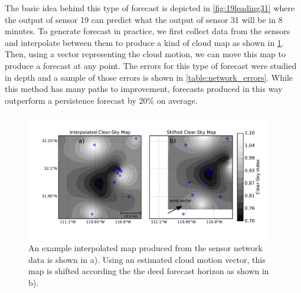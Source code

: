 The basic idea behind this type of forecast is depicted in
\cref{fig:19leading31} where the output of sensor 19 can predict what
the output of sensor 31 will be in 8 minutes.
To generate forecast in practice, we first collect data from the
sensors and interpolate between them to produce a kind of cloud map as
shown in \cref{fig:clearmap}.
Then, using a vector representing the cloud motion, we can move this
map to produce a forecast at any point.
The errors for this type of forecast were studied in depth and a
sample of those errors is shown in \cref{table:network_errors}.
While this method has many paths to improvement, forecasts produced in
this way outperform a persistence forecast by 20\% on average.

\begin{figure}[hbtp]
\centering
\includegraphics[width=0.96\textwidth]{figs/clearmap.pdf}
\caption[Illustration of the network forecast methodology]{An example
  interpolated map produced from the sensor network data is shown in
  a). Using an estimated cloud motion vector, this map is shifted
  according the the deed forecast horizon as shown in b).}
\label{fig:clearmap}
\end{figure}

